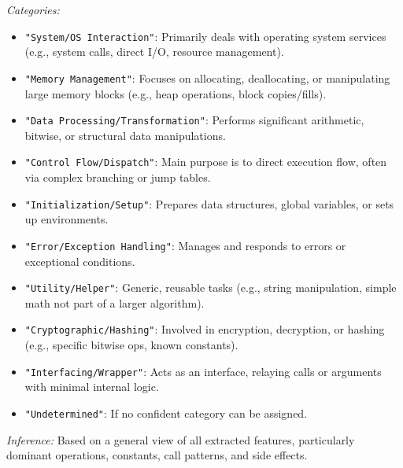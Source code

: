 \begin{tcolorbox}
\textit{Categories:}
\begin{itemize}[noitemsep, topsep=1pt]
        \item \texttt{"System/OS Interaction"}: Primarily deals with operating system services (e.g., system calls, direct I/O, resource management).
        \item \texttt{"Memory Management"}: Focuses on allocating, deallocating, or manipulating large memory blocks (e.g., heap operations, block copies/fills).
        \item \texttt{"Data Processing/Transformation"}: Performs significant arithmetic, bitwise, or structural data manipulations.
        \item \texttt{"Control Flow/Dispatch"}: Main purpose is to direct execution flow, often via complex branching or jump tables.
        \item \texttt{"Initialization/Setup"}: Prepares data structures, global variables, or sets up environments.
        \item \texttt{"Error/Exception Handling"}: Manages and responds to errors or exceptional conditions.
        \item \texttt{"Utility/Helper"}: Generic, reusable tasks (e.g., string manipulation, simple math not part of a larger algorithm).
        \item \texttt{"Cryptographic/Hashing"}: Involved in encryption, decryption, or hashing (e.g., specific bitwise ops, known constants).
        \item \texttt{"Interfacing/Wrapper"}: Acts as an interface, relaying calls or arguments with minimal internal logic.
        \item \texttt{"Undetermined"}: If no confident category can be assigned.
\end{itemize}
\textit{Inference:} Based on a general view of all extracted features, particularly dominant operations, constants, call patterns, and side effects.
\end{tcolorbox}


\twocolumn



